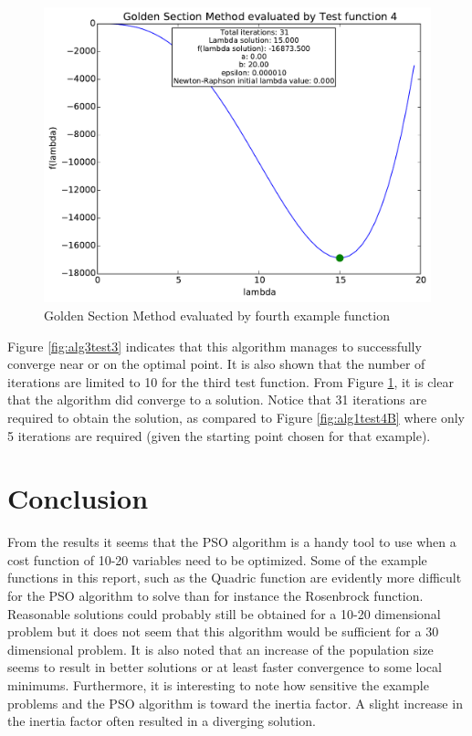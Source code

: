 \documentclass[a4paper,10pt]{article}
\begin{document}
\begin{figure}[h]
\centering
 \includegraphics[scale=0.55]{./graphs/algorithm3/testFunction4.pdf} 
 \caption{Golden Section Method evaluated by fourth example function}
 \label{fig:alg3test4}
\end{figure}

Figure \ref{fig:alg3test3} indicates that this algorithm manages to successfully converge near or on the optimal point. It is also shown that the number of iterations are limited to 10 for the third test function. From Figure \ref{fig:alg3test4}, it is clear that the algorithm did converge to a solution. Notice that 31 iterations are required to obtain the solution, as compared to Figure \ref{fig:alg1test4B} where only 5 iterations are required (given the starting point chosen for that example).

\newpage
\section{Conclusion}


From the results it seems that the PSO algorithm is a handy tool to use when a cost function of 10-20 variables need to be optimized. Some of the example functions in this report, such as the Quadric function are evidently more difficult for the PSO algorithm to solve than for instance the Rosenbrock function. Reasonable solutions could probably still be obtained for a 10-20 dimensional problem but it does not seem that this algorithm would be sufficient for a 30 dimensional problem. It is also noted that an increase of the population size seems to result in better solutions or at least faster convergence to some local minimums. Furthermore, it is interesting to note how sensitive the example problems and the PSO algorithm is toward the inertia factor. A slight increase in the inertia factor often resulted in a diverging solution.
\end{document}
